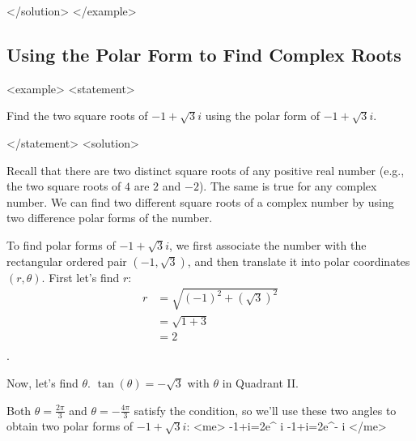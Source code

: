       </solution>
    </example>
  
  
    \subsection*{Using the Polar Form to Find Complex Roots}
    <example>
      <statement>
        
          Find the two square roots of $-1+\sqrt{3}i$ using the polar form of $-1+\sqrt{3}i$.
        
      </statement>
      <solution>
        
          Recall that there are two distinct square roots of any positive real number (e.g., the two square roots of $4$ are $2$ and $-2$). The same is true for any complex number. We can find two different square roots of a complex number by using two difference polar forms of the number.
        
        
          To find polar forms of $-1+\sqrt{3}i$, we first associate the number with the rectangular ordered pair $\left( -1,\sqrt{3}\right)$, and then translate it into polar coordinates $\left( r,\theta\right)$. First let's find $r$:
            \begin{align*}
              r &= \sqrt{ \left( -1\right) ^2+ \left( \sqrt{3}\right) ^2} \\
               &= \sqrt{1+3} \\
               &=2 \\
            \end{align*}.
        
        
          Now, let's find $\theta$. $\tan(\theta)=-\sqrt{3}$ with $\theta$ in Quadrant II.
        
        
          Both $\theta=\frac{2\pi}{3}$ and $\theta=-\frac{4\pi}{3}$ satisfy the condition, so we'll use these two angles to obtain two polar forms of $-1+\sqrt{3}i$:
          <me>
            -1+i=2e^{ \cdot i}  -1+i=2e^{- \cdot i}
          </me>
        
